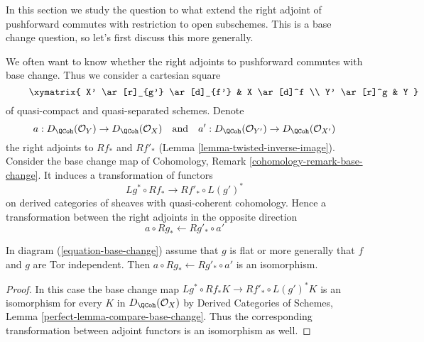 \noindent
In this section we study the question to what extend the right adjoint
of pushforward commutes with restriction to open subschemes. This is
a base change question, so let's first discuss this more generally.

\medskip\noindent
We often want to know whether the right adjoints to pushforward commutes
with base change. Thus we consider a cartesian square
\begin{equation}
\label{equation-base-change}
\vcenter{
\xymatrix{
X' \ar[r]_{g'} \ar[d]_{f'} & X \ar[d]^f \\
Y' \ar[r]^g & Y
}
}
\end{equation}
of quasi-compact and quasi-separated schemes.
Denote
$$
a  : D_\QCoh(\mathcal{O}_Y) \to D_\QCoh(\mathcal{O}_X)
\quad\text{and}\quad
a'  : D_\QCoh(\mathcal{O}_{Y'}) \to D_\QCoh(\mathcal{O}_{X'})
$$
the right adjoints to $Rf_*$ and $Rf'_*$
(Lemma \ref{lemma-twisted-inverse-image}).
Consider the base change map of
Cohomology, Remark \ref{cohomology-remark-base-change}.
It induces a transformation of functors
$$
Lg^* \circ Rf_* \longrightarrow Rf'_* \circ L(g')^*
$$
on derived categories of sheaves with quasi-coherent cohomology.
Hence a transformation between the right adjoints in the opposite direction
$$
a \circ Rg_* \longleftarrow Rg'_* \circ a'
$$

\begin{lemma}
\label{lemma-flat-precompose-pus}
In diagram (\ref{equation-base-change}) assume that $g$ is flat or
more generally that $f$ and $g$ are Tor independent. Then
$a \circ Rg_* \leftarrow Rg'_* \circ a'$ is an isomorphism.
\end{lemma}

\begin{proof}
In this case the base change map
$Lg^* \circ Rf_* K \longrightarrow Rf'_* \circ L(g')^*K$
is an isomorphism for every $K$ in $D_\QCoh(\mathcal{O}_X)$ by
Derived Categories of Schemes, Lemma \ref{perfect-lemma-compare-base-change}.
Thus the corresponding transformation between adjoint functors
is an isomorphism as well.
\end{proof}

